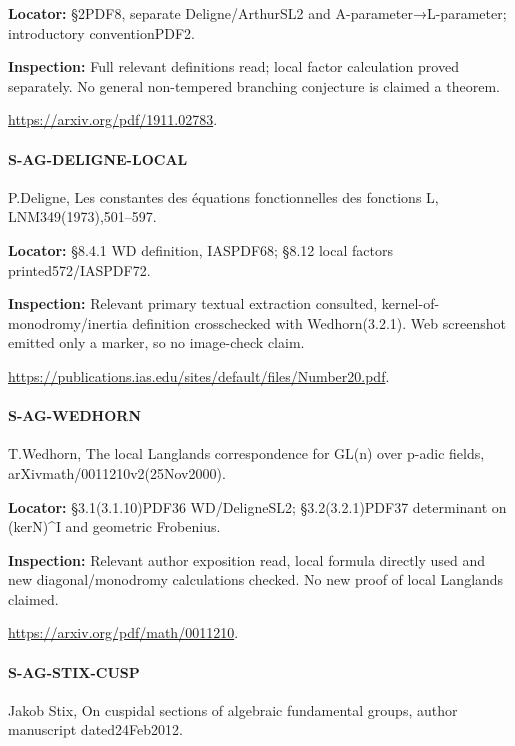 \documentclass[11pt,a4paper]{article}
\begin{document}
\textbf{Locator:} §2PDF8, separate Deligne/\allowbreak{}ArthurSL2 and A-parameter→L-parameter; introductory conventionPDF2.

\textbf{Inspection:} Full relevant definitions read; local factor calculation proved separately.\allowbreak{} No general non-tempered branching conjecture is claimed a theorem.\allowbreak{}

\url{https://arxiv.org/pdf/1911.02783}.

\paragraph{S-AG-DELIGNE-LOCAL} P.\allowbreak{}Deligne, Les constantes des équations fonctionnelles des fonctions L, LNM349(1973),501–\allowbreak{}597.

\textbf{Locator:} §8.\allowbreak{}4.\allowbreak{}1 WD definition, IASPDF68; §8.\allowbreak{}12 local factors printed572/\allowbreak{}IASPDF72.

\textbf{Inspection:} Relevant primary textual extraction consulted, kernel-of-monodromy/\allowbreak{}inertia definition crosschecked with Wedhorn(3.\allowbreak{}2.\allowbreak{}1).\allowbreak{} Web screenshot emitted only a marker, so no image-check claim.\allowbreak{}

\url{https://publications.ias.edu/sites/default/files/Number20.pdf}.

\paragraph{S-AG-WEDHORN} T.\allowbreak{}Wedhorn, The local Langlands correspondence for GL(n) over p-adic fields, arXivmath/\allowbreak{}0011210v2(25Nov2000).

\textbf{Locator:} §3.\allowbreak{}1(3.\allowbreak{}1.\allowbreak{}10)PDF36 WD/\allowbreak{}DeligneSL2; §3.\allowbreak{}2(3.\allowbreak{}2.\allowbreak{}1)PDF37 determinant on (kerN)\textasciicircum{}I and geometric Frobenius.

\textbf{Inspection:} Relevant author exposition read, local formula directly used and new diagonal/\allowbreak{}monodromy calculations checked.\allowbreak{} No new proof of local Langlands claimed.\allowbreak{}

\url{https://arxiv.org/pdf/math/0011210}.

\paragraph{S-AG-STIX-CUSP} Jakob Stix, On cuspidal sections of algebraic fundamental groups, author manuscript dated24Feb2012.
\end{document}
